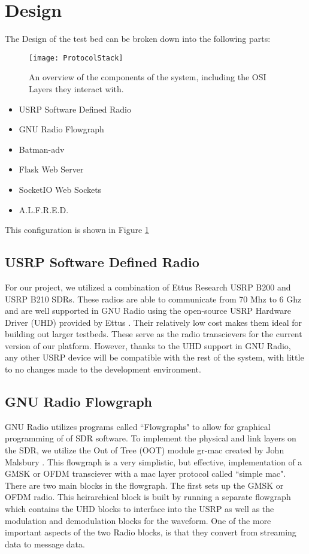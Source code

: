 \section{Design}

The Design of the test bed can be broken down into the following parts:

\begin{figure}
	\centering
	\texttt{[image: ProtocolStack]}
	\caption{An overview of the components of the system, including the OSI Layers they interact with. \cite{0003} \cite{0007} \cite{0008} \cite{0015} \cite{0012} \cite{0011}}
	\label{fig:ProtocolStack}
\end{figure}

\begin{itemize}
	\item USRP Software Defined Radio
	\item GNU Radio Flowgraph
	\item Batman-adv
	\item Flask Web Server
	\item SocketIO Web Sockets
	\item A.L.F.R.E.D. 
\end{itemize}

This configuration is shown in Figure \ref{fig:ProtocolStack}

\subsection{USRP Software Defined Radio}

For our project, we utilized a combination of Ettus Research USRP B200 and USRP B210 SDRs. These radios are able to communicate from 70 Mhz to 6 Ghz and are well supported in GNU Radio using the open-source USRP Hardware Driver (UHD) provided by Ettus \cite{0007}. Their relatively low cost makes them ideal for building out larger testbeds. These serve as the radio transcievers for the current version of our platform. However, thanks to the UHD support in GNU Radio, any other USRP device will be compatible with the rest of the system, with little to no changes made to the development environment. 

\subsection{GNU Radio Flowgraph}

GNU Radio utilizes programs called ``Flowgraphs" to allow for graphical programming of of SDR software. To implement the physical and link layers on the SDR, we utilize the Out of Tree (OOT) module gr-mac created by John Malsbury \cite{0015}. This flowgraph is a very simplistic, but effective, implementation of a GMSK or OFDM transciever with a mac layer protocol called ``simple mac". There are two main blocks in the flowgraph. The first sets up the GMSK or OFDM radio. This heirarchical block is built by running a separate flowgraph which contains the UHD blocks to interface into the USRP as well as the modulation and demodulation blocks for the waveform. One of the more important aspects of the two Radio blocks, is that they convert from streaming data to message data. 

